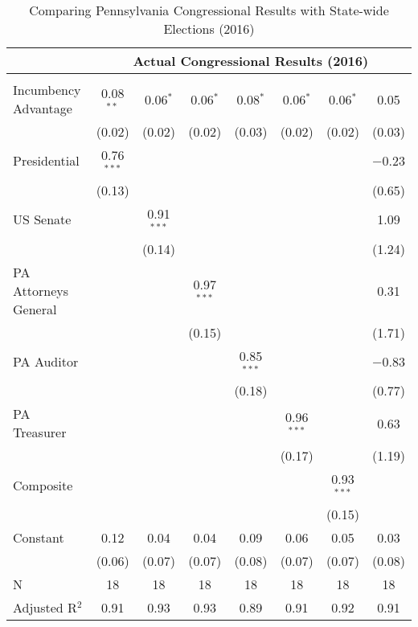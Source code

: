 \begin{table}[!htbp] \centering 
  \caption{Comparing Pennsylvania Congressional Results with State-wide Elections (2016)} 
  \label{tab:tab_congress_predict} 
\begin{tabular}{@{\extracolsep{0pt}}lccccccc} 
\\[-1.8ex] & \multicolumn{7}{c}{Actual Congressional Results (2016)} \\ 
\hline \\[-1.8ex] 
 Incumbency Advantage & 0.08$^{**}$ & 0.06$^{*}$ & 0.06$^{*}$ & 0.08$^{*}$ & 0.06$^{*}$ & 0.06$^{*}$ & 0.05 \\ 
  & (0.02) & (0.02) & (0.02) & (0.03) & (0.02) & (0.02) & (0.03) \\ 
  Presidential & 0.76$^{***}$ &  &  &  &  &  & $-$0.23 \\ 
  & (0.13) &  &  &  &  &  & (0.65) \\ 
  US Senate &  & 0.91$^{***}$ &  &  &  &  & 1.09 \\ 
  &  & (0.14) &  &  &  &  & (1.24) \\ 
  PA Attorneys General &  &  & 0.97$^{***}$ &  &  &  & 0.31 \\ 
  &  &  & (0.15) &  &  &  & (1.71) \\ 
  PA Auditor &  &  &  & 0.85$^{***}$ &  &  & $-$0.83 \\ 
  &  &  &  & (0.18) &  &  & (0.77) \\ 
  PA Treasurer &  &  &  &  & 0.96$^{***}$ &  & 0.63 \\ 
  &  &  &  &  & (0.17) &  & (1.19) \\ 
  Composite &  &  &  &  &  & 0.93$^{***}$ &  \\ 
  &  &  &  &  &  & (0.15) &  \\ 
  Constant & 0.12 & 0.04 & 0.04 & 0.09 & 0.06 & 0.05 & 0.03 \\ 
  & (0.06) & (0.07) & (0.07) & (0.08) & (0.07) & (0.07) & (0.08) \\ 
 N & 18 & 18 & 18 & 18 & 18 & 18 & 18 \\ 
Adjusted R$^{2}$ & 0.91 & 0.93 & 0.93 & 0.89 & 0.91 & 0.92 & 0.91 \\ 
\end{tabular}
\end{table}
